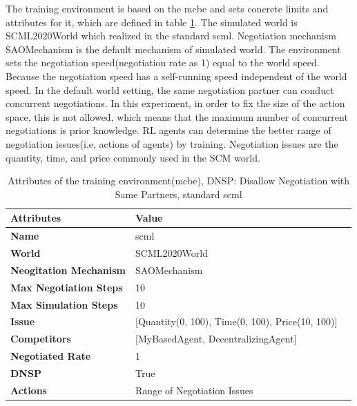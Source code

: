 The training environment is based on the \gls{mcbe} and sets concrete limits and attributes for it, which are defined in table \ref{tab:attributes-mcbe-dynamical-range-negotiation-issue}. The simulated world is SCML2020World which realized in the standard scml. Negotiation mechanism SAOMechanism is the default mechanism of simulated world. The environment sets the negotiation speed(negotiation rate as 1) equal to the world speed. Because the negotiation speed has a self-running speed independent of the world speed. In the default world setting, the same negotiation partner can conduct concurrent negotiations. In this experiment, in order to fix the size of the action space, this is not allowed, which means that the maximum number of concurrent negotiations is prior knowledge. RL agents can determine the better range of negotiation issues(i.e, actions of agents) by training. Negotiation issues are the quantity, time, and price commonly used in the SCM world.

\begin{table}[htbp]
\centering
\begin{tabular}{l l l} \toprule
\bfseries \textbf{Attributes}    & \bfseries \textbf{Value}                                             \\ \midrule
\textbf{Name}                    & scml                                                                 \\
\textbf{World}                   & SCML2020World                                                        \\
\textbf{Neogitation Mechanism}   & SAOMechanism                                                         \\
\textbf{Max Negotiation Steps}   & 10                                                                   \\
\textbf{Max Simulation Steps}    & 10                                                                   \\
\textbf{Issue}             	     & [Quantity(0, 100), Time(0, 100), Price(10, 100)]                     \\
\textbf{Competitors}             & [MyBasedAgent, DecentralizingAgent]                                  \\
\textbf{Negotiated Rate}         &    1                                                                 \\
\textbf{DNSP}                    &    True                             \\
\textbf{Actions}                 & Range of Negotiation Issues                                          \\
\bottomrule
\end{tabular}
\caption{Attributes of the training environment(mcbe), DNSP: Disallow Negotiation with Same Partners, standard scml}
\label{tab:attributes-mcbe-dynamical-range-negotiation-issue}
\end{table}

